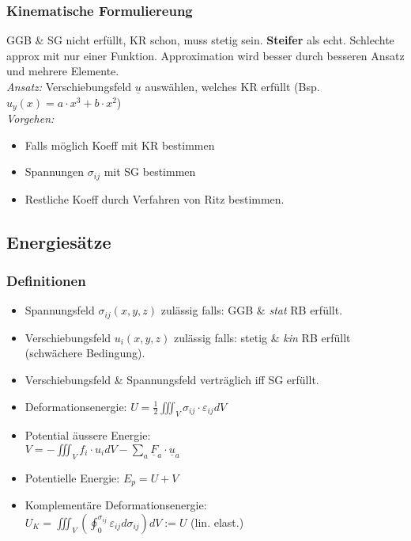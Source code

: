         \subsubsection{Kinematische Formuliereung}
            GGB \& SG nicht erfüllt, KR schon, muss stetig sein. \textbf{Steifer} als echt. Schlechte approx mit nur einer Funktion. Approximation wird besser durch besseren Ansatz und mehrere Elemente.
            \\\textit{Ansatz:} Verschiebungsfeld $\underline{u}$ auswählen, welches KR erfüllt (Bsp. $u_y(x) = a\cdot x^3+b\cdot x^2$)
            \\\textit{Vorgehen:}
            \vspace{-2mm}
            \begin{itemize}
                \item Falls möglich Koeff mit KR bestimmen
                \item Spannungen $\sigma_{ij}$ mit SG bestimmen
                \item Restliche Koeff durch Verfahren von Ritz bestimmen.
            \end{itemize}
            \vspace{1mm}
            
    \subsection{Energiesätze}
        \subsubsection{Definitionen}
            \begin{itemize}
                \item Spannungsfeld $\sigma_{ij}(x,y,z)$ zulässig falls: GGB \& \textit{stat} RB erfüllt.
                \item Verschiebungsfeld $u_i(x,y,z)$ zulässig falls: stetig \& \textit{kin} RB erfüllt (schwächere Bedingung).
                \item Verschiebungsfeld \& Spannungsfeld verträglich iff SG erfüllt.
                \item Deformationsenergie: $U=\frac{1}{2}\iiint_V \sigma_{ij}\cdot\varepsilon_{ij}dV$
                \item Potential äussere Energie:\\
                $V=-\iiint_V f_i\cdot u_idV-\sum_{a}\underline{F}_a\cdot\underline{u}_a$
                \item Potentielle Energie: $E_p=U+V$
                \item Komplementäre Deformationsenergie:\\ $U_K=\iiint_V(\oint_0^{\sigma_{ij}}\varepsilon_{ij}d\sigma_{ij})dV := U$  (lin. elast.)
            \end{itemize}
            

